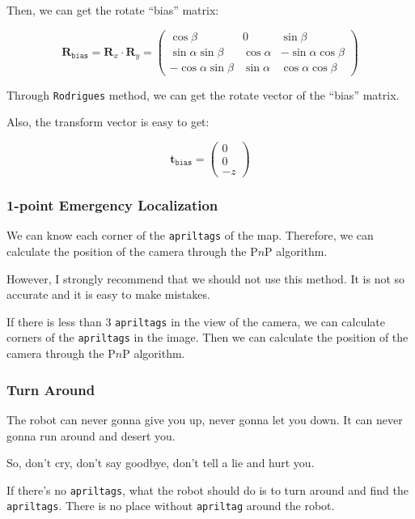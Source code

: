 \documentclass{article}
\begin{document}
Then, we can get the rotate ``bias'' matrix:

\begin{equation}
  \boldsymbol{R}_{\texttt{bias}}=\boldsymbol{R}_x\cdot \boldsymbol{R}_y= \left(
    \begin{matrix}
      \cos\beta & 0 & \sin\beta \\
      \sin\alpha\sin\beta & \cos\alpha & -\sin\alpha\cos\beta \\
      -\cos\alpha\sin\beta & \sin\alpha & \cos\alpha\cos\beta
    \end{matrix}
  \right)
\end{equation}

Through \texttt{Rodrigues} method, we can get the rotate vector of the ``bias'' matrix.

Also, the transform vector is easy to get:

\begin{equation}
  \boldsymbol{t}_{\texttt{bias}}=\left(
    \begin{matrix}
      0 \\
      0 \\
      -z
    \end{matrix}
  \right)
\end{equation}

\subsubsection{1-point Emergency Localization}
We can know each corner of the \texttt{apriltags} of the map. Therefore, we can calculate the position of the camera through the P$n$P algorithm.

However, I strongly recommend that we should not use this method. It is not so accurate and it is easy to make mistakes.

If there is less than $3$ \texttt{apriltags} in the view of the camera, we can calculate corners of the \texttt{apriltags} in the image. Then we can calculate the position of the camera through the P$n$P algorithm.

\subsubsection{Turn Around}
The robot can never gonna give you up, never gonna let you down. It can never gonna run around and desert you.

So, don't cry, don't say goodbye, don't tell a lie and hurt you.

If there's no \texttt{apriltags}, what the robot should do is to turn around and find the \texttt{apriltags}. There is no place without \texttt{apriltag} around the robot.
\end{document}

